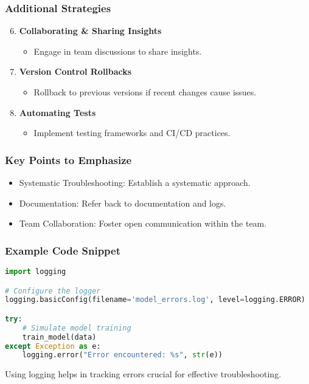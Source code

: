 \documentclass[aspectratio=169]{beamer}
\begin{document}
\begin{frame}
    \frametitle{Additional Strategies}
    \begin{enumerate}
        \setcounter{enumi}{5}
        \item \textbf{Collaborating \& Sharing Insights}
            \begin{itemize}
                \item Engage in team discussions to share insights.
            \end{itemize}
        \item \textbf{Version Control Rollbacks}
            \begin{itemize}
                \item Rollback to previous versions if recent changes cause issues.
            \end{itemize}
        \item \textbf{Automating Tests}
            \begin{itemize}
                \item Implement testing frameworks and CI/CD practices.
            \end{itemize}
    \end{enumerate}
\end{frame}

\begin{frame}[fragile]
    \frametitle{Key Points to Emphasize}
    \begin{itemize}
        \item Systematic Troubleshooting: Establish a systematic approach.
        \item Documentation: Refer back to documentation and logs.
        \item Team Collaboration: Foster open communication within the team.
    \end{itemize}
\end{frame}

\begin{frame}[fragile]
    \frametitle{Example Code Snippet}
    \begin{lstlisting}[language=Python]
import logging

# Configure the logger
logging.basicConfig(filename='model_errors.log', level=logging.ERROR)

try:
    # Simulate model training
    train_model(data)
except Exception as e:
    logging.error("Error encountered: %s", str(e))
    \end{lstlisting}
    Using logging helps in tracking errors crucial for effective troubleshooting.
\end{frame}
\end{document}

